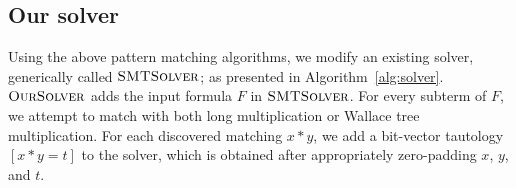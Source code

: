 \subsection{Our solver}


Using the above pattern matching algorithms, we modify an existing
solver, generically called $\textsc{SMTSolver}$; as presented in Algorithm~\ref{alg:solver}.
%
$\textsc{OurSolver}$ adds the input formula $F$ in $\textsc{SMTSolver}$.
%
For every subterm of $F$, we attempt to match with both long multiplication
or Wallace tree multiplication.
%
For each discovered matching $x*y$, we add a bit-vector tautology $[x*y = t]$ 
to the solver, which is obtained after
appropriately zero-padding $x$, $y$, and $t$.
%



